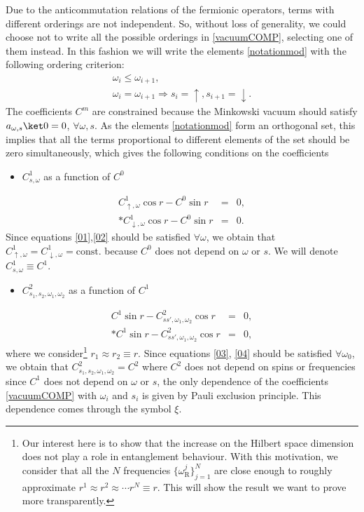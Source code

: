 Due to the anticommutation relations of the fermionic operators, terms with different orderings are not independent.
So, without loss of generality, we could choose not to write all the possible orderings in \eqref{vacuumCOMP}, selecting one of them instead. In this fashion we will write the elements \eqref{notationmod} with the following ordering criterion:
\begin{eqnarray}\label{ordering}
 \nonumber & \omega_i\le \omega_{i+1}, &\\
 &\omega_i=\omega_{i+1}\Rightarrow s_i=\uparrow,s_{i+1}=\downarrow.&
 \end{eqnarray}
The coefficients $C^m$ are constrained because the Minkowski vacuum should satisfy 
$a_{\omega,s}\ket0=0$, $\forall \omega,s$. 
As the elements \eqref{notationmod} form an orthogonal set, this implies that all the terms proportional to different elements of the set should be zero simultaneously, which gives the following conditions on the coefficients
\begin{itemize}
\item $C^1_{s,\omega}$ as a function of $C^0$\\[-9mm]
\end{itemize}
\begin{eqnarray}
\label{01} C^1_{\uparrow,\omega}\cos r-C^0\sin r&=&0,\\*
C^1_{\downarrow,\omega}\cos r-C^0\sin r&=&0. \label{02}
\end{eqnarray}
Since equations \eqref{01},\eqref{02} should be satisfied $\forall \omega$, we obtain that $C^1_{\uparrow,\omega}=C^1_{\downarrow,\omega}=\text{const.}$ because $C^0$ does not depend on $\omega$ or $s$. We will denote $C^1_{s,\omega}\equiv C^1$.
\begin{itemize}
\item $C^2_{s_1,s_2,\omega_1,\omega_2}$ as a function of $C^1$\\[-9mm]
\end{itemize}
\begin{eqnarray}
\label{03}  C^1\sin r- C^2_{ss',\omega_1,\omega_2}\cos r&=&0,\\*
\label{04}  C^1\sin r- C^2_{ss',\omega_1,\omega_2}\cos r&=&0,
\end{eqnarray}
where we consider\footnote{Our interest here is to show that the increase on the Hilbert space dimension does not play a role in entanglement behaviour. With this motivation, we consider that all the $N$ frequencies $\{\omega^j_\text{R}\}_{j=1}^N$ are close enough to roughly approximate $r^1\approx r^2\approx\cdots r^N\equiv r$. This will show the result we want to prove more transparently. } $r_1\approx r_2\equiv r$. Since equations \eqref{03}, \eqref{04} should be satisfied $\forall \omega_0$, we obtain that $C^2_{s_1,s_2,\omega_1,\omega_2}=C^2$ where $C^2$ does not depend on spins or frequencies since $C^1$ does not depend on $\omega$ or $s$, the only dependence of the coefficients \eqref{vacuumCOMP} with $\omega_i$ and $s_i$ is given by Pauli exclusion principle. This dependence comes through the symbol $\xi$.

